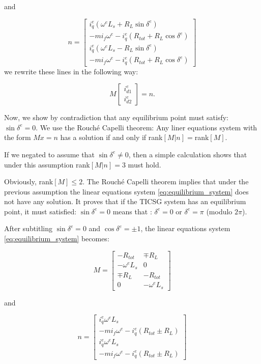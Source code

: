 \documentclass[letterpaper, 10 pt, conference]{ieeeconf}  %
\begin{document}
and 

\[
n=\left[\begin{array}{c}
i_{q}^{e}\left(\omega^{e}L_{s}+R_{L}\sin\delta^{e}\right)\\
-mi_{f}\omega^{e}-i_{q}^{e}\left(R_{tot}+R_{L}\cos\delta^{e}\right)\\
i_{q}^{e}\left(\omega^{e}L_{s}-R_{L}\sin\delta^{e}\right)\\
-mi_{f}\omega^{e}-i_{q}^{e}\left(R_{tot}+R_{L}\cos\delta^{e}\right)
\end{array}\right]
\]
we rewrite these lines in the following way:

\begin{equation}
M\left[\begin{array}{c}
i_{d1}^{e}\\
i_{d2}^{e}
\end{array}\right]=n.\label{eq:equilibrium_system}
\end{equation}

Now, we  show by contradiction that any equilibrium point must satisfy: $\sin\delta^e=0$.
We use the Rouch\'e Capelli theorem:  Any liner equations system with the form  $Mx=n$ has a  solution if and only if rank$\left[M|n\right]=$rank$\left[M\right].$

If we negated to assume that $\sin\delta^{e}\ne0$, then a simple calculation shows that under this assumption  rank$\left[M|n\right]=3$ must hold.

Obviously, rank$\left[M\right]\le2$.  The Rouch\'e Capelli theorem implies that under the
previous assumption the linear equations system \eqref{eq:equilibrium_system} does not have any solution. It proves that  if the TICSG system has an equilibrium point, it must satisfied: $\sin\delta^{e}=0$ means that : $\delta^{e}=0$ or $\delta^e = \pi$ (modulo $2\pi$).

After subtitling $\sin\delta^{e}=0$
and $\cos\delta^{e}=\pm 1$, the linear equations system  \eqref{eq:equilibrium_system} becomes:

$$
M=\left[\begin{array}{cc}
-R_{tot} & \mp R_{L}\\
-\omega^{e}L_{s} & 0\\
  \mp R_{L} & -R_{tot}\\
0 & -\omega^{e}L_{s}
\end{array}\right]
$$

and 

$$
n=\left[\begin{array}{c}
i_{q}^{e}\omega^{e}L_{s}\\
-mi_{f}\omega^{e}-i_{q}^{e}\left(R_{tot} \pm R_{L}\right)\\
i_{q}^{e}\omega^{e}L_{s}\\
-mi_{f}\omega^{e}-i_{q}^{e}\left(R_{tot} \pm R_{L}\right)
\end{array}\right]
$$
\end{document}

